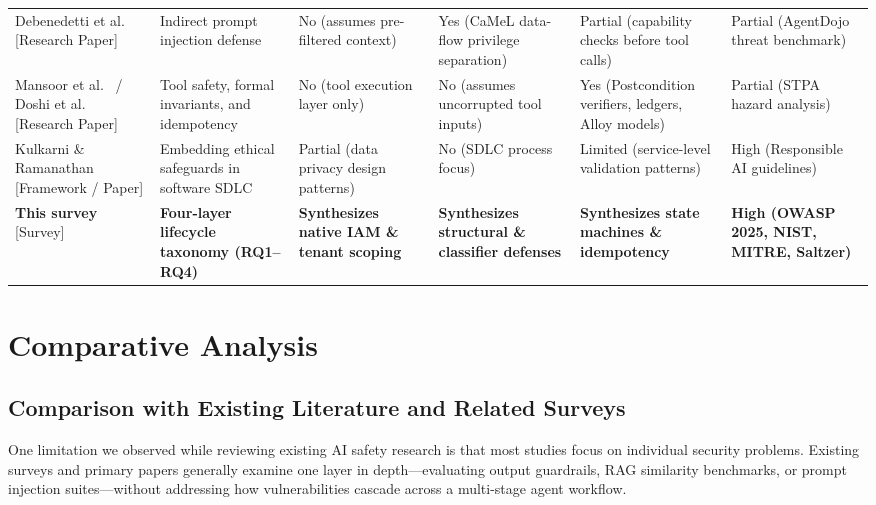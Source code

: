 \documentclass[sigconf]{acmart}
\begin{document}
\begin{table}[t]
\begin{tabular}{p{2.7cm}p{3.2cm}p{2.4cm}p{2.5cm}p{2.6cm}p{2.4cm}}
Debenedetti et al.~\cite{debenedetti2026camel} [Research Paper] & Indirect prompt injection defense & No (assumes pre-filtered context) & Yes (CaMeL data-flow privilege separation) & Partial (capability checks before tool calls) & Partial (AgentDojo threat benchmark) \\
\addlinespace
Mansoor et al.~\cite{mansoor2026verifiedtoolcalls} / Doshi et al.~\cite{doshi2026verifiablysafetooluse} [Research Paper] & Tool safety, formal invariants, and idempotency & No (tool execution layer only) & No (assumes uncorrupted tool inputs) & Yes (Postcondition verifiers, ledgers, Alloy models) & Partial (STPA hazard analysis) \\
\addlinespace
Kulkarni \& Ramanathan~\cite{kulkarni2025grails} [Framework / Paper] & Embedding ethical safeguards in software SDLC & Partial (data privacy design patterns) & No (SDLC process focus) & Limited (service-level validation patterns) & High (Responsible AI guidelines) \\
\midrule
\textbf{This survey} [Survey] & \textbf{Four-layer lifecycle taxonomy (RQ1--RQ4)} & \textbf{Synthesizes native IAM \& tenant scoping} & \textbf{Synthesizes structural \& classifier defenses} & \textbf{Synthesizes state machines \& idempotency} & \textbf{High (OWASP 2025, NIST, MITRE, Saltzer)} \\
\bottomrule
\end{tabular}
\end{table}

\section{Comparative Analysis}
\label{sec:comparative}

\subsection{Comparison with Existing Literature and Related Surveys}
One limitation we observed while reviewing existing AI safety research is that most studies focus on individual security problems. Existing surveys and primary papers generally examine one layer in depth—evaluating output guardrails, RAG similarity benchmarks, or prompt injection suites—without addressing how vulnerabilities cascade across a multi-stage agent workflow.
\end{document}
